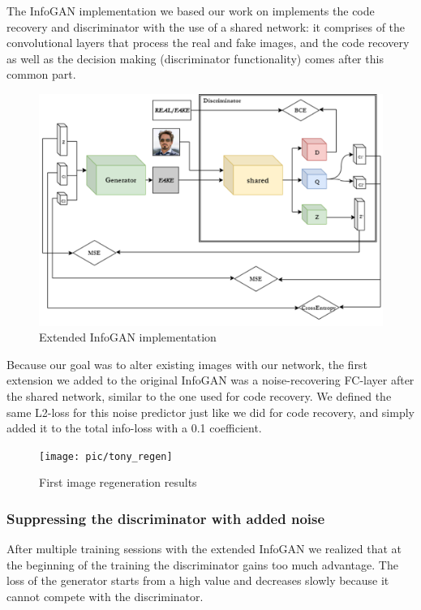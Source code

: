 \documentclass[10pt,journal,compsoc]{IEEEtran}
\begin{document}
The InfoGAN implementation we based our work on implements the code recovery and discriminator with the use of a shared network: it comprises of the convolutional layers that process the real and fake images, and the code recovery as well as the decision making (discriminator functionality) comes after this common part.

\begin{figure}[h]
	\centering
	\includegraphics[width=\linewidth]{pic/Infogan_diss_predicting}
	\caption{Extended InfoGAN implementation}
	\label{fig:infogan_simple_noise}
\end{figure}



Because our goal was to alter existing images with our network, the first extension we added to the original InfoGAN was a noise-recovering FC-layer after the shared network, similar to the one used for code recovery. We defined the same L2-loss for this noise predictor just like we did for code recovery, and simply added it to the total info-loss with a 0.1 coefficient.

\begin{figure}[h]
	\centering
	\texttt{[image: pic/tony\_regen]}
	\caption{First image regeneration results}
	\label{fig:tony_regen}
\end{figure}


\subsubsection{Suppressing the discriminator with added noise}

After multiple training sessions with the extended InfoGAN we realized that at the beginning of the training the discriminator gains too much advantage. The loss of the generator starts from a high value and decreases slowly because it cannot compete with the discriminator.
\end{document}
